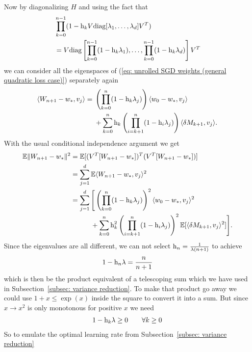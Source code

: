 Now by diagonalizing \(H\) and using the fact that
\begin{align*}
	&\prod_{k=0}^{n-1} (1-\text{h}_k V\text{diag}[\lambda_1, \dots, \lambda_d]V^T)\\
	&= V \text{diag}\left[
		\prod_{k=0}^{n-1}(1-\text{h}_k\lambda_1),
		\dots, \prod_{k=0}^{n-1}(1-\text{h}_k\lambda_d)
	\right]V^T
\end{align*}
we can consider all the eigenspaces of (\ref{eq: unrolled SGD weights (general
quadratic loss case)}) separately again
\begin{align*}
	\langle W_{n+1}-w_*, v_j \rangle
	= \begin{aligned}[t]
		&\left(\prod_{k=0}^n(1-\text{h}_k\lambda_j)\right) \langle w_0-w_*, v_j\rangle\\
		&+ \sum_{k=0}^n \text{h}_k \left(\prod_{i=k+1}^n(1-\text{h}_i\lambda_j)\right)\langle\delta M_{k+1},v_j\rangle.
	\end{aligned}
\end{align*}
With the usual conditional independence argument we get
\begin{align*}
	\mathbb{E}\|W_{n+1}-w_*\|^2
	&= \mathbb{E}[(V^T [W_{n+1}-w_*])^T(V^T[W_{n+1}-w_*])]\\
	&= \sum_{j=1}^d \mathbb{E}\langle W_{n+1}-w_*, v_j \rangle^2\\
	&= \sum_{j=1}^d
	\begin{aligned}[t]
		&\Bigg[\left(\prod_{k=0}^n(1-\text{h}_k\lambda_j)\right)^2 \langle w_0-w_*, v_j\rangle^2\\
		&+ \sum_{k=0}^n \text{h}_k^2 \left(\prod_{i=k+1}^n(1-\text{h}_i\lambda_j)\right)^2\mathbb{E}[\langle\delta M_{k+1},v_j\rangle^2]\Bigg].
	\end{aligned}
\end{align*}
Since the eigenvalues are all different, we can not select \(\text{h}_n=\frac{1}{\lambda(n+1)}\)
to achieve
\begin{align*}
	1-\text{h}_n\lambda = \frac{n}{n+1}
\end{align*}
which is then be the product equivalent of a telescoping sum which we have used in
Subsection~\ref{subsec: variance reduction}. To make that product go away we
could use \(1+x\le \exp(x)\) inside the square to convert it into a sum.
But since \(x\to x^2\) is only monotonous for positive \(x\) we need
\begin{align*}
	1-\text{h}_k \lambda \ge 0 \qquad \forall k\ge 0
\end{align*}
So to emulate the optimal learning rate from Subsection~\ref{subsec: variance reduction}
